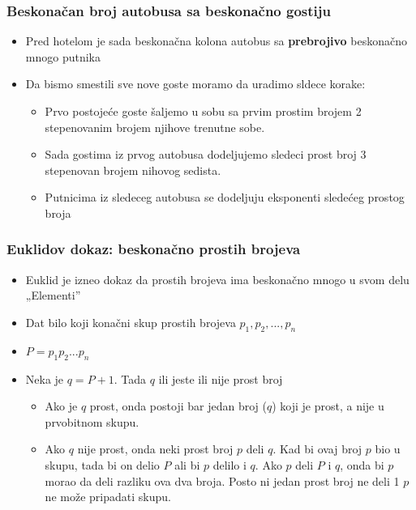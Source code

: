 \documentclass{beamer}
\begin{document}
\begin{frame}[fragile]\frametitle{Beskonačan broj autobusa sa beskonačno gostiju}
\begin{itemize}
    \item Pred hotelom je sada beskonačna kolona autobus sa \textbf{prebrojivo} beskonačno mnogo putnika
    \item Da bismo smestili sve nove goste moramo da uradimo sldece korake:
    \begin{itemize}
        \item Prvo postojeće goste šaljemo u sobu sa prvim prostim brojem 2 stepenovanim brojem njihove trenutne sobe.
        \item Sada gostima iz prvog autobusa dodeljujemo sledeci prost broj 3 stepenovan brojem nihovog sedista.
        \item Putnicima iz sledeceg autobusa se dodeljuju eksponenti sledećeg prostog broja
    \end{itemize}
\end{itemize}
\end{frame}

\begin{frame}[fragile]\frametitle{Euklidov dokaz: beskonačno prostih brojeva}
\begin{itemize}
    \item Euklid je izneo dokaz da prostih brojeva ima beskonačno mnogo u svom delu „Elementi”
    \item Dat bilo koji konačni skup prostih brojeva $p_{1}, p_{2}, ..., p_{n}$
    \item $P = p_{1}p_{2}...p_{n}$
    \item Neka je $q = P + 1$. Tada $q$ ili jeste ili nije prost broj
    \begin{itemize}
        \item Ako je $q$ prost, onda postoji bar jedan broj ($q$) koji je prost, a nije u prvobitnom skupu.
        \item Ako $q$ nije prost, onda neki prost broj $p$ deli $q$. Kad bi ovaj broj $p$ bio u skupu, tada bi on delio $P$ ali bi $p$ delilo i $q$. Ako $p$ deli $P$ i $q$, onda bi $p$ morao da deli razliku ova dva broja. Posto ni jedan prost broj ne deli 1 $p$ ne može pripadati skupu.
    \end{itemize}
\end{itemize}
\end{frame}
\end{document}
